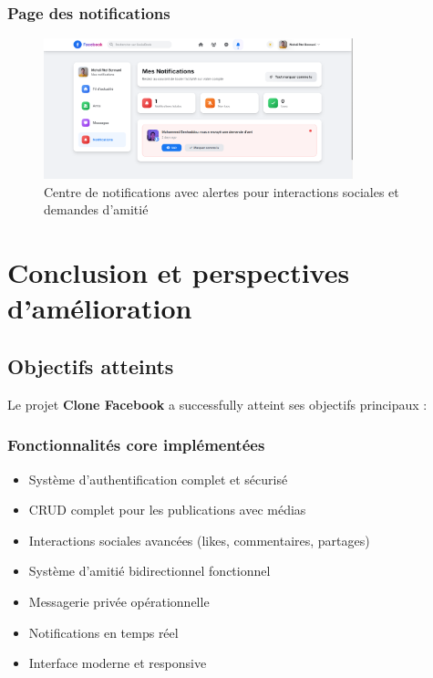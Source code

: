 \documentclass[12pt,a4paper]{article}
\begin{document}
\subsubsection{Page des notifications}
\begin{figure}[H]
    \centering
    \includegraphics[width=0.8\textwidth]{screenshots/notifications.png}
    \caption{Centre de notifications avec alertes pour interactions sociales et demandes d'amiti\'e}
    \label{fig:notifications}
\end{figure}

\section{Conclusion et perspectives d'am\'elioration}

\subsection{Objectifs atteints}

Le projet \textbf{Clone Facebook} a successfully atteint ses objectifs principaux :

\subsubsection{Fonctionnalit\'es core impl\'ement\'ees}
\begin{itemize}
    \item Syst\`eme d'authentification complet et s\'ecuris\'e
    \item CRUD complet pour les publications avec m\'edias
    \item Interactions sociales avanc\'ees (likes, commentaires, partages)
    \item Syst\`eme d'amiti\'e bidirectionnel fonctionnel
    \item Messagerie priv\'ee op\'erationnelle
    \item Notifications en temps r\'eel
    \item Interface moderne et responsive
\end{itemize}
\end{document}
